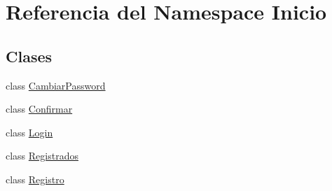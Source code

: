 \hypertarget{namespaceInicio}{}\section{Referencia del Namespace Inicio}
\label{namespaceInicio}
\subsection*{Clases}
\begin{DoxyCompactItemize}
\item 
class \mbox{\hyperlink{classInicio_1_1CambiarPassword}{Cambiar\+Password}}
\item 
class \mbox{\hyperlink{classInicio_1_1Confirmar}{Confirmar}}
\item 
class \mbox{\hyperlink{classInicio_1_1Login}{Login}}
\item 
class \mbox{\hyperlink{classInicio_1_1Registrados}{Registrados}}
\item 
class \mbox{\hyperlink{classInicio_1_1Registro}{Registro}}
\end{DoxyCompactItemize}
